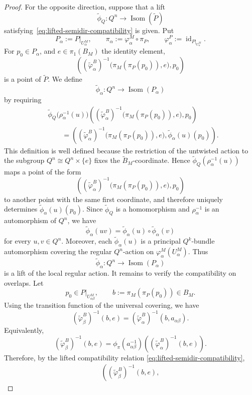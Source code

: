 \documentclass[11pt,a4paper]{article}
\newcommand{\e}{e}
\numberwithin{equation}{section}
\theoremstyle{named}
\begin{document}
\begin{proof}
For the opposite direction, suppose that a lift
\[
\widetilde\phi_Q:
Q^n\longrightarrow\operatorname{Isom}(\widetilde P)
\]
satisfying~\eqref{eq:lifted-semidir-compatibility} is given. Put
\[
P_\alpha:=P|_{U_\alpha^M},
\qquad
\pi_\alpha:=\varphi_\alpha^M\circ\pi_P,
\qquad
\varphi_\alpha^P:=\operatorname{id}_{P|_{U_\alpha^M}}.
\]
For \(p_0\in P_\alpha\), and \(\e\in \pi_1(B_M)\) the identity element, 
\[
\left(
(\widetilde\varphi_\alpha^B)^{-1}
\bigl(\pi_M(\pi_P(p_0)),e\bigr),
p_0
\right)
\]
is a point of \(\widetilde P\). We define
\[
\widetilde\phi_\alpha:
Q^n\longrightarrow\operatorname{Isom}(P_\alpha)
\]
by requiring
\begin{align*}
&
\widetilde\phi_Q\bigl(\rho_\alpha^{-1}(u)\bigr)
\left(
(\widetilde\varphi_\alpha^B)^{-1}
\bigl(\pi_M(\pi_P(p_0)),e\bigr),
p_0
\right)
\\
&\qquad =
\left(
(\widetilde\varphi_\alpha^B)^{-1}
\bigl(\pi_M(\pi_P(p_0)),e\bigr),
\widetilde\phi_\alpha(u)(p_0)
\right).
\end{align*}
This definition is well defined because the restriction of the untwisted action to the subgroup $Q^n\cong Q^n\times\{e\}$
fixes the \(\widetilde B_M\)-coordinate. Hence
\(\widetilde\phi_Q(\rho_\alpha^{-1}(u))\) maps a point of the form
\[
\left(
(\widetilde\varphi_\alpha^B)^{-1}
\bigl(\pi_M(\pi_P(p_0)),e\bigr),
p_0
\right)
\]
to another point with the same first coordinate, and therefore uniquely determines \(\widetilde\phi_\alpha(u)(p_0)\). Since \(\widetilde\phi_Q\) is a homomorphism and \(\rho_\alpha^{-1}\) is an automorphism of \(Q^n\), we have
\[
\widetilde\phi_\alpha(uv)
=
\widetilde\phi_\alpha(u)\circ
\widetilde\phi_\alpha(v)
\]
for every \(u,v\in Q^n\). Moreover, each \(\widetilde\phi_\alpha(u)\) is a principal \(Q^k\)-bundle automorphism covering the regular \(Q^n\)-action on
\(\varphi_\alpha^M(U_\alpha^M)\). Thus
\[
\widetilde\phi_\alpha:
Q^n\longrightarrow\operatorname{Isom}(P_\alpha)
\]
is a lift of the local regular action. It remains to verify the compatibility on overlaps. Let
\[
p_0\in P|_{U_{\alpha\beta}^M},
\qquad
b:=\pi_M(\pi_P(p_0))\in B_M.
\]
Using the transition function of the universal covering, we have
\[
(\widetilde\varphi_\beta^B)^{-1}(b,e)
=
(\widetilde\varphi_\alpha^B)^{-1}(b,a_{\alpha\beta}).
\]
Equivalently,
\[
(\widetilde\varphi_\beta^B)^{-1}(b,e)
=
\phi_\pi(a_{\alpha\beta}^{-1})
\left(
(\widetilde\varphi_\alpha^B)^{-1}(b,e)
\right).
\]
Therefore, by the lifted compatibility relation
\eqref{eq:lifted-semidir-compatibility},
\begin{align*}
\left(
(\widetilde\varphi_\beta^B)^{-1}(b,e),

\end{align*}
\end{proof}
\end{document}
